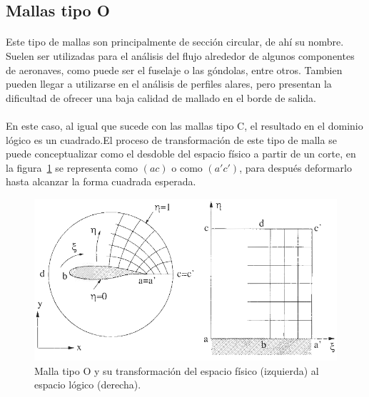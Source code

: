\documentclass[letterpaper, openright, 12pt]{book}
\begin{document}
    \subsection{Mallas tipo O}
    \paragraph*{}
        Este tipo de mallas son principalmente de sección circular, de ahí su
        nombre. Suelen ser utilizadas para el análisis del flujo alrededor de
        algunos componentes de aeronaves, como puede ser el fuselaje o las
        góndolas, entre otros.\cite{vladimir-grid} Tambien pueden llegar a
        utilizarse en el análisis de perfiles alares, pero presentan la
        dificultad de ofrecer una baja calidad de mallado en el borde de salida.\cite{blazek}\cite{best-practices-grid-generation}
    \paragraph*{}
        En este caso, al igual que sucede con las mallas tipo C, el resultado en
        el dominio lógico es un cuadrado.El proceso de transformación de este
        tipo de malla se puede conceptualizar como el desdoble del espacio
        físico a partir de un corte, en la figura~\ref{fig:malla-o} se
        representa como $(ac)$ o como $(a'c')$, para después deformarlo hasta
        alcanzar la forma cuadrada esperada.
            \begin{figure}[htbp!]
                \centering
                    \includegraphics[keepaspectratio, width=170mm]{./Imagenes/malla-o}
                    \captionsetup{justification=centering, margin=2cm}
                    \caption[Malla tipo O]{Malla tipo O y su transformación del
                    espacio físico (izquierda) al espacio lógico (derecha).\cite{blazek}}
                \label{fig:malla-o}
            \end{figure}
\end{document}
